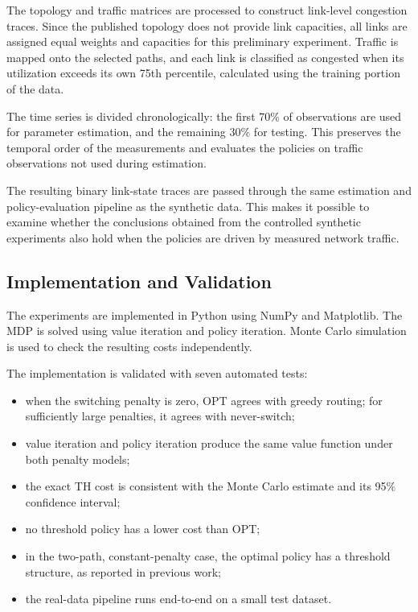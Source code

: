 \documentclass{amsart}
\begin{document}
The topology and traffic matrices are processed to construct link-level congestion traces. Since the published topology does not provide link capacities, all links are assigned equal weights and capacities for this preliminary experiment. Traffic is mapped onto the selected paths, and each link is classified as congested when its utilization exceeds its own 75th percentile, calculated using the training portion of the data.

The time series is divided chronologically: the first 70\% of observations are used for parameter estimation, and the remaining 30\% for testing. This preserves the temporal order of the measurements and evaluates the policies on traffic observations not used during estimation.

The resulting binary link-state traces are passed through the same estimation and policy-evaluation pipeline as the synthetic data. This makes it possible to examine whether the conclusions obtained from the controlled synthetic experiments also hold when the policies are driven by measured network traffic.

\subsection{Implementation and Validation}
\label{sec:valid}

The experiments are implemented in Python using NumPy and
Matplotlib. The MDP is solved using value iteration and policy
iteration. Monte Carlo simulation is used to check the resulting
costs independently.

The implementation is validated with seven automated tests:
\begin{itemize}
    \item when the switching penalty is zero, OPT agrees with greedy
    routing; for sufficiently large penalties, it agrees with
    never-switch;
    \item value iteration and policy iteration produce the same
    value function under both penalty models;
    \item the exact TH cost is consistent with the Monte Carlo
    estimate and its 95\% confidence interval;
    \item no threshold policy has a lower cost than OPT;
    \item in the two-path, constant-penalty case, the optimal policy
    has a threshold structure, as reported in previous work;
    \item the real-data pipeline runs end-to-end on a small test
    dataset.
\end{itemize}
\end{document}
